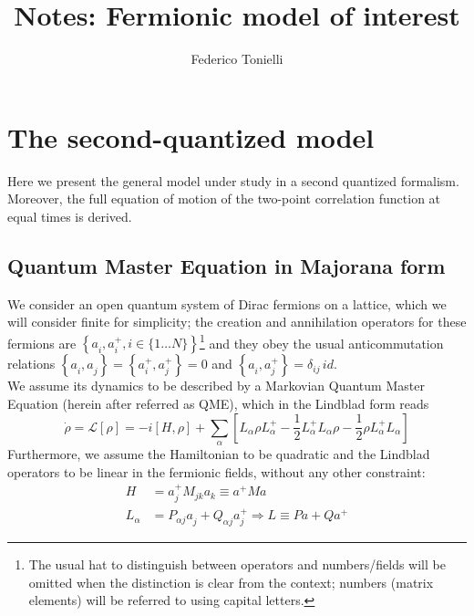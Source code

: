 \documentclass[a4paper,11pt]{article}
\title{Notes: Fermionic model of interest}
\author{Federico Tonielli}
\newcommand\blankpage{%
    \null
    \thispagestyle{empty}%
    \addtocounter{page}{-1}%
    \newpage}
\theoremstyle{remark}
\newcommand{\ro}{\rho}
\newcommand{\np}{\vskip 1.3cm}
\begin{document}
 \maketitle
 
 \tableofcontents
 \blankpage
 
 \section{The second-quantized model}
 Here we present the general model under study in a second quantized formalism.  Moreover, the full equation of motion of the two-point correlation function at equal times is derived.
  \np
  \subsection{Quantum Master Equation in Majorana form}
   We consider an open quantum system of Dirac fermions on a lattice, which we will consider finite for simplicity; the creation and annihilation operators for these fermions are $\left \{ a_i^{ },a_i^+, i\in \{1\dots N\} \right \} $\footnote{ The usual hat to distinguish between operators and numbers/fields will be omitted when the distinction is clear from the context; numbers (matrix elements) will be referred to using capital letters.} and they obey the usual anticommutation relations $\left\{a_i^{ },a_j^{ }\right\} = \left\{a_i^{+},a_j^+\right \}=0$ and $\left\{a_i^{ },a_j^+\right \} = \delta_{ij}\,id $.\\  We assume its dynamics to be described by a Markovian Quantum Master Equation (herein after referred as QME), which in the Lindblad form reads
   \[\dot{\ro}=\mathcal{L}[\ro]=-i\left[H,\ro\right]+\sum_{\alpha}\left[L_{\alpha}^{ }\ro L_{\alpha}^+ - \frac{1}{2}L_{\alpha}^+L_{\alpha}^{ }\ro - \frac{1}{2}\ro L_{\alpha}^+L_{\alpha}^{ }\right]  \]
   Furthermore, we assume the Hamiltonian to be quadratic and the Lindblad operators to be linear in the fermionic fields, without any other constraint: 
   \begin{subequations}        %
   \label{eq:quadr_dyn}         %
   \begin{align}
    H & = a_j^+M_{jk}a_k^{ } \equiv a^+Ma \label{eq:quadr_ham}\\         %
    L_{\alpha} & = P^{ }_{\alpha j}a_j^{ } + Q^{ }_{\alpha j}a_j^+ \Rightarrow L \equiv P a + Q a^+ \label{eq:quadr_lindb}
   \end{align}
   \end{subequations}
\end{document}
